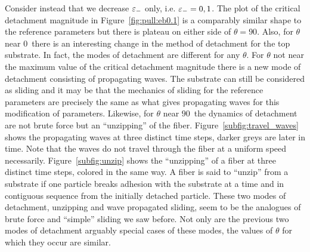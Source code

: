 {Consider instead that we decrease $\varepsilon_-$ only, i.e. $\varepsilon_-=0,1$. The plot of the critical detachment magnitude in Figure~\ref{fig:pull:eb0.1} is a comparably similar shape to the reference parameters but there is plateau on either side of $\theta=90$\textdegree. Also, for $\theta$ near $0$\textdegree\ there is an interesting change in the method of detachment for the top substrate. In fact, the modes of detachment are different for any $\theta$. For $\theta$ not near the maximum value of the critical detachment magnitude there is a new mode of detachment consisting of propagating waves. The substrate can still be considered as sliding and it may be that the mechanics of sliding for the reference parameters are precisely the same as what gives propagating waves for this modification of parameters. Likewise, for $\theta$ near $90$\textdegree\ the dynamics of detachment are not brute force but an ``unzipping'' of the fiber. Figure~\ref{subfig:travel_waves} shows the propagating waves at three distinct time steps, darker greys are later in time. Note that the waves do not travel through the fiber at a uniform speed necessarily. Figure~\ref{subfig:unzip} shows the ``unzipping'' of a fiber at three distinct time steps, colored in the same way. A fiber is said to ``unzip'' from a substrate if one particle breaks adhesion with the substrate at a time and in contiguous sequence from the initially detached particle. These two modes of detachment, unzipping and wave propagated sliding, seem to be the analogues of brute force and ``simple'' sliding we saw before. Not only are the previous two modes of detachment arguably special cases of these modes, the values of $\theta$ for which they occur are similar.

}
